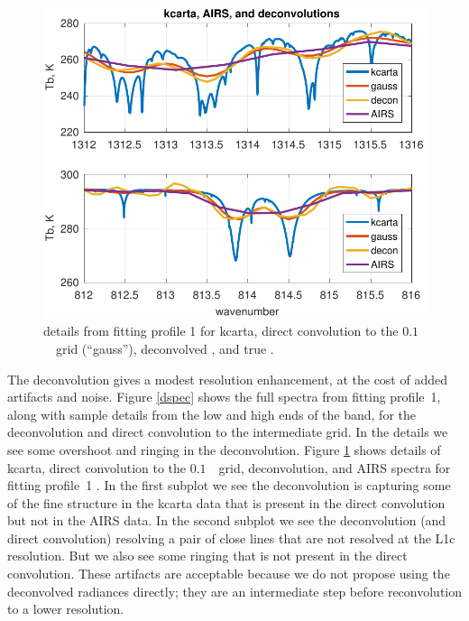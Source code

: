 \documentclass[10pt,twocolumn]{article}  %
\begin{document}
\begin{figure} %
  \centering
  \includegraphics[width=\linewidth]{figures/airs_decon_zoom.pdf}
  \caption{details from fitting profile 1 for kcarta, direct
    convolution to the $0.1$~\wn\ grid (``gauss''), deconvolved
    {\airs}, and true {\airs}.}
  \label{dzoom}
\end{figure}


The {\airs} deconvolution gives a modest resolution enhancement, at
the cost of added artifacts and noise.  Figure \ref{dspec} shows the
full spectra from fitting profile~1, along with sample details from
the low and high ends of the band, for the deconvolution and direct
convolution to the intermediate grid.  In the details we see some
overshoot and ringing in the deconvolution.  Figure \ref{dzoom}
shows details of kcarta, direct convolution to the $0.1$~\wn\ grid,
deconvolution, and AIRS spectra for fitting profile~1
\cite{sarta1,sarta2}.  In the first subplot we see the deconvolution
is capturing some of the fine structure in the kcarta data that is
present in the direct convolution but not in the AIRS data.  In the
second subplot we see the deconvolution (and direct convolution)
resolving a pair of close lines that are not resolved at the {\airs}
L1c resolution.  But we also see some ringing that is not present in
the direct convolution.  These artifacts are acceptable because we
do not propose using the deconvolved radiances directly; they are an
intermediate step before reconvolution to a lower resolution.
\end{document}
